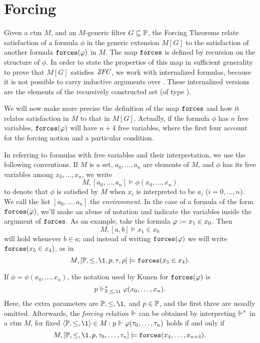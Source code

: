 \section{Forcing}
\label{sec:forcing}

Given a ctm $M$, and an $M$-generic filter $G\subseteq\mathbb{P}$, the Forcing
Theorems relate satisfaction of a formula 
$\phi$ in the generic extension $M[G]$ to the satisfaction of another
formula $\mathop{\mathtt{forces}}(\varphi)$ in $M$. The map $\mathop{\mathtt{forces}}$ is defined by
recursion on 
the structure of $\phi$. In order to state the properties of this map
in sufficient generality to prove that  $M[G]$ satisfies $\mathit{ZFC}$, we work with
internalized formulas, because it is not possible to carry inductive
arguments over \tyo. These internalized versions are the elements of
the recursively constructed set \formula{} (of type \tyi).

We will now make more precise the definition of the map
$\mathop{\mathtt{forces}}$ and how it relates satisfaction in $M$ to that in
$M[G]$. Actually, if the formula $\phi$ has $n$ free variables,
$\mathop{\mathtt{forces}}(\varphi)$ will have $n+4$ free variables, where the first four account
for the forcing notion and a particular condition. 

In referring to formulas with free variables and their interpretation,
we use the following conventions. If  $M$ is a set, $a_0,\dots,a_n$
are elements of $M$, and $\phi$ has its free variables
among $x_0,\dots,x_n$, we write
\[
M,[a_0,\dots,a_n] \models \phi(x_0,\dots,x_n)
\]
to denote that $\phi$ is satisfied by $M$ when $x_i$ is interpreted
to be $a_i$ ($i=0,\dots,n$). We call the list $[a_0,\dots,a_n]$ the
\emph{environment}. In the case of a formula of the form
$\mathop{\mathtt{forces}}(\varphi)$, we'll make an abuse of notation and indicate the
variables inside the argument of $\mathop{\mathtt{forces}}$. As an example, take the
formula $\varphi\mathrel{\mathop:}= x_1\in x_0$. Then
\[
M,[a,b] \models x_1\in x_0
\]
will hold whenever $b\in a$; and instead of writing $\mathop{\mathtt{forces}}(\varphi)$
we will write $\mathop{\mathtt{forces}}(x_5\in x_4)$, as in
\[
M,[\PP,\leq,\1,p,\tau,\rho] \models \forceisa(x_5\in x_4).
\]

If
$\phi=\phi(x_0,\dots,x_n)$, the notation used by Kunen
\cite{kunen2011set,kunen1980} for $\mathop{\mathtt{forces}}(\varphi)$ is 
\[
p\forces_{\PP,\leq,\1}^* \phi(x_0,\dots,x_n).
\]
Here, the extra parameters are $\PP,\leq,\1,$ and $p\in\mathbb{P}$, and the
first three are usually omitted. %
Afterwards, the \emph{forcing relation}
$\Vdash$ can be obtained by 
interpreting $\Vdash^*$ in a ctm $M$, for fixed
$\lb\PP,\leq,\1\rb\in M$: $p\Vdash \varphi(\tau_0,\dots,\tau_n)$ holds
if and only if
\begin{equation}\label{eq:3}
M,[\PP,\leq,\1,p,\tau_0,\dots,\tau_n]\models \forceisa(x_4,\dots,x_{n+4}).
\end{equation}

